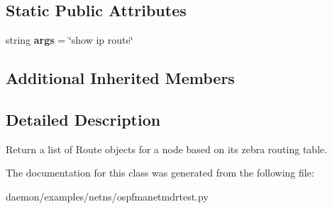 \subsection*{Static Public Attributes}
\begin{DoxyCompactItemize}
\item 
\hypertarget{classospfmanetmdrtest_1_1_zebra_routes_a02e5588cdc351b1e3e030100731cef7f}{string {\bfseries args} = \char`\"{}show ip route\char`\"{}}\label{classospfmanetmdrtest_1_1_zebra_routes_a02e5588cdc351b1e3e030100731cef7f}

\end{DoxyCompactItemize}
\subsection*{Additional Inherited Members}


\subsection{Detailed Description}
\begin{DoxyVerb}Return a list of Route objects for a node based on its zebra
    routing table.
\end{DoxyVerb}
 

The documentation for this class was generated from the following file\+:\begin{DoxyCompactItemize}
\item 
daemon/examples/netns/ospfmanetmdrtest.\+py\end{DoxyCompactItemize}
